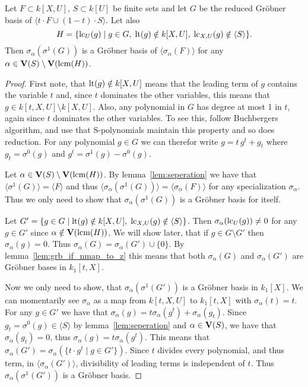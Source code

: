 \begin{lemma}\label{lem:grb_if_nmap_to_z_t}
  Let $F \subset k[X, U]$, $S \subset k[U]$ be finite sets %
  and let $G$ be the reduced Gröbner basis of $\langle t\cdot F \cup (1-t)\cdot S \rangle$. Let also \[H = \{\operatorname{lc}_{U}(g) \mid g \in G,\; \operatorname{lt}(g) \notin k[X, U],\; \operatorname{lc}_{X, U}(g) \notin \langle S \rangle\}.\] Then $\sigma_{\alpha}(\sigma^{1}(G))$ is a Gröbner basis of $\langle \sigma_{\alpha}(F) \rangle$ for any $\alpha \in \operatorname{\mathbf V}(S) \setminus \operatorname{\mathbf V}(\operatorname{lcm}(H))$.
\end{lemma}
\begin{proof}
  First note, that $\operatorname{lt}(g) \notin k[X, U]$ means that the leading term of $g$ contains the variable $t$ and, since $t$ dominates the other variables, this means that $g \in k[t, X, U] \setminus k[X, U]$. Also, any polynomial in $G$ has degree at most 1 in $t$, again since $t$ dominates the other variables. To see this, follow Buchbergers algorithm, and use that S-polynomials maintain this property and so does reduction. For any polynomial $g \in G$ we can therefor write $g = t\,g^{t} + g_{t}$ where $g_{t} = \sigma^{0}(g)$ and $g^{t} = \sigma^{1}(g) - \sigma^{0}(g)$.

  Let $\alpha \in \operatorname{\mathbf V}(S) \setminus \operatorname{\mathbf V}(\operatorname{lcm}(H))$. By lemma~\ref{lem:seperation} we have that $\langle \sigma^{1}(G) \rangle = \langle F \rangle$ and thus $\langle \sigma_{\alpha}(\sigma^{1}(G)) \rangle = \langle \sigma_{\alpha}(F) \rangle$ for any specialization $\sigma_{\alpha}$. Thus we only need to show that $\sigma_{\alpha}(\sigma^{1}(G))$ is a Gröbner basis for itself.

  Let $G' = \{g \in G \mid \operatorname{lt}(g) \notin k[X, U],\; \operatorname{lc}_{X, U}(g) \notin \langle S \rangle \}$. Then $\sigma_{\alpha}(\operatorname{lc}_{U}(g)) \neq 0$ for any $g \in G'$ since $\alpha \notin \operatorname{\mathbf V}(\operatorname{lcm}(H))$. We will show later, that if $g \in G \setminus G'$ then $\sigma_{\alpha}(g) = 0$. Thus $\sigma_{\alpha}(G) = \sigma_{\alpha}(G') \cup \{0\}$. By lemma~\ref{lem:grb_if_nmap_to_z} this means that both $\sigma_{\alpha}(G)$ and $\sigma_{\alpha}(G')$ are Gröbner bases in $k_{1}[t, X]$.

  Now we only need to show, that $\sigma_{\alpha}(\sigma^{1}(G'))$ is a Gröbner basis in $k_{1}[X]$. We can momentarily see $\sigma_{\alpha}$ as a map from $k[t, X, U]$ to $k_{1}[t, X]$ with $\sigma_{\alpha}(t) = t$. For any $g \in G'$ we have that $\sigma_{\alpha}(g) = t \sigma_{\alpha}(g^{t}) + \sigma_{\alpha}(g_{t})$. Since $g_{t} = \sigma^{0}(g) \in \langle S \rangle$ by lemma~\ref{lem:seperation} and $\alpha \in \operatorname{\mathbf V}(S)$, we have that $\sigma_{\alpha}(g_{t}) = 0$, thus $\sigma_{\alpha}(g) = t \sigma_{\alpha}(g^{t})$. This means that $\sigma_{\alpha}(G') = \sigma_{\alpha}(\{t \cdot g^{t} \mid g \in G'\})$. Since $t$ divides every polynomial, and thus term, in $\langle \sigma_{\alpha}(G') \rangle$, divisibility of leading terms is independent of $t$. Thus $\sigma_{\alpha}(\sigma^{1}(G'))$ is a Gröbner basis.


\end{proof}
